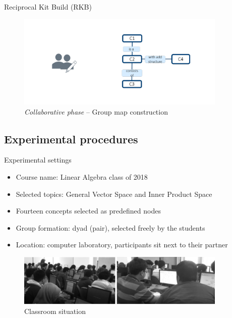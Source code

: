\begin{frame}[allowframebreaks]{Reciprocal Kit Build (RKB)}
     \begin{figure}[tb]
         \begin{center}
             \includegraphics[width=100mm]{images/RKB_p4.pdf}
         \end{center}
         \caption{\emph{Collaborative phase} -- Group map construction}
         \label{intro::rkb_p4}
     \end{figure}
\end{frame}

\subsection{Experimental procedures}

\begin{frame}{Experimental settings}
\begin{itemize}
    \item Course name: Linear Algebra class of 2018
    \item Selected topics: General Vector Space and Inner Product Space
    \item Fourteen concepts selected as predefined nodes
    \item Group formation: dyad (pair), selected freely by the students
    \item Location: computer laboratory, participants sit next to their partner
\end{itemize}

\begin{figure}[tb]
    \begin{center}
            \includegraphics[width=100mm]{images/classroom_situation.pdf}
        \end{center}
        \caption{Classroom situation}
        \label{intro::classroom}
    \end{figure}

\end{frame}

